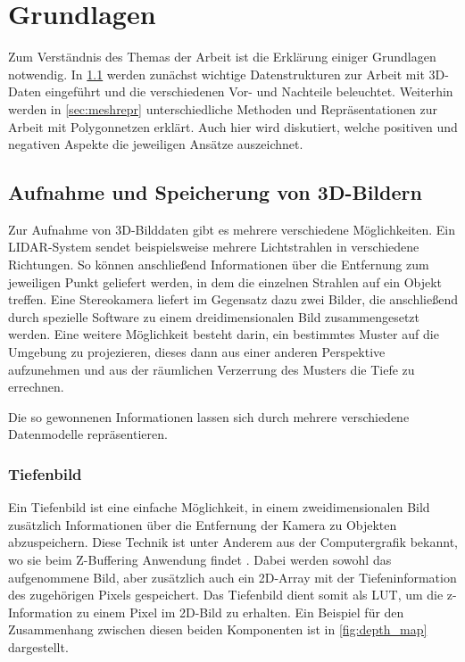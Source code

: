 
\chapter{Grundlagen}
\label{ch:grundlagen}

Zum Verständnis des Themas der Arbeit ist die Erklärung einiger Grundlagen notwendig.
In \ref{sec:3d-bilder} werden zunächst wichtige Datenstrukturen zur Arbeit mit 3D-Daten eingeführt und die verschiedenen Vor- und Nachteile beleuchtet.
Weiterhin werden in \ref{sec:meshrepr} unterschiedliche Methoden und Repräsentationen zur Arbeit mit Polygonnetzen erklärt.
Auch hier wird diskutiert, welche positiven und negativen Aspekte die jeweiligen Ansätze auszeichnet.


\section{Aufnahme und Speicherung von 3D-Bildern}
\label{sec:3d-bilder}

Zur Aufnahme von 3D-Bilddaten gibt es mehrere verschiedene Möglichkeiten.
Ein LIDAR-System sendet beispielsweise mehrere Lichtstrahlen in verschiedene Richtungen.
So können anschließend Informationen über die Entfernung zum jeweiligen Punkt geliefert werden, in dem die einzelnen Strahlen auf ein Objekt treffen.
Eine Stereokamera liefert im Gegensatz dazu zwei Bilder, die anschließend durch spezielle Software zu einem dreidimensionalen Bild zusammengesetzt werden.
Eine weitere Möglichkeit besteht darin, ein bestimmtes Muster auf die Umgebung zu projezieren, dieses dann aus einer anderen Perspektive aufzunehmen und aus der räumlichen Verzerrung des Musters die Tiefe zu errechnen.

Die so gewonnenen Informationen lassen sich durch mehrere verschiedene Datenmodelle repräsentieren.


\subsection{Tiefenbild}
\label{subsec:tiefenbild}

Ein Tiefenbild ist eine einfache Möglichkeit, in einem zweidimensionalen Bild zusätzlich Informationen über die Entfernung der Kamera zu Objekten abzuspeichern.
Diese Technik ist unter Anderem aus der Computergrafik bekannt, wo sie beim Z-Buffering Anwendung findet \cite[32]{catmull1974subdivision}.
Dabei werden sowohl das aufgenommene Bild, aber zusätzlich auch ein 2D-Array mit der Tiefeninformation des zugehörigen Pixels gespeichert.
Das Tiefenbild dient somit als \ac{LUT}, um die z-Information zu einem Pixel im 2D-Bild zu erhalten.
Ein Beispiel für den Zusammenhang zwischen diesen beiden Komponenten ist in \autoref{fig:depth_map} dargestellt.

